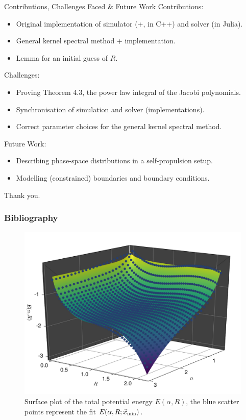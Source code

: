\documentclass[aspectratio=169, hyperref={colorlinks=true}]{beamer}
\begin{document}
  \begin{frame}{Contributions, Challenges Faced \& Future Work}
    Contributions:
    \begin{itemize}
      \tightlist
      \item Original implementation of simulator (+, in C++) and solver (in Julia).
      \item General kernel spectral method + implementation.
      \item Lemma for an initial guess of $R$.
    \end{itemize}

    Challenges:
    \begin{itemize}
      \tightlist
      \item Proving Theorem 4.3, the power law integral of the Jacobi polynomials.
      \item Synchronisation of simulation and solver (implementations).
      \item Correct parameter choices for the general kernel spectral method.
    \end{itemize}

    Future Work:
    \begin{itemize}
      \tightlist
      \item Describing phase-space distributions in a self-propulsion setup.
      \item Modelling (constrained) boundaries and boundary conditions.
    \end{itemize}
  \end{frame}

  \begin{frame}{}
    Thank you.
  \end{frame}

  \begin{frame}[allowframebreaks]
    \frametitle{Bibliography}
    \printbibliography[heading=bibnumbered]
    \printnoidxglossary[type=acronym, title={Acronyms}]
  \end{frame}

  \appendix
  \begin{frame}
    \begin{figure}[H]
      \centering
      \includegraphics[width=0.65\linewidth]{results/attrep/multivariate-energy-3d.pdf}
      \caption[Surface plot of the total potential energy $E(\alpha, R)$]{Surface plot of the total potential energy $E(\alpha, R)$, the blue scatter points represent the fit $E(\alpha, R; \vec{x}_{\rm min})$.}
      \label{fig:multivariate-energy-3d}
    \end{figure}
  \end{frame}
\end{document}
